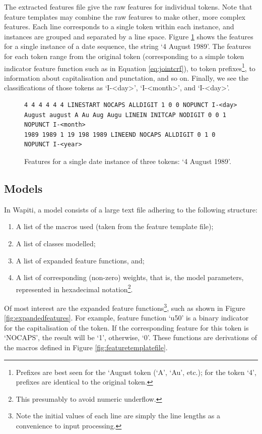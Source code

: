 The extracted features file give the raw features for individual tokens. Note that feature templates may combine the raw features to make other, more complex features. Each line corresponds to a single token within each instance, and instances are grouped and separated by a line space. Figure \ref{fig:extractedfeatures} shows the features for a single instance of a date sequence, the string `4 August 1989'. The features for each token range from the original token (corresponding to a simple token indicator feature function such as in Equation \ref{eq:jointcrf}), to token prefixes\footnote{Prefixes are best seen for the `August token (`A', `Au', etc.); for the token `4', prefixes are identical to the original token.}, to information about capitalisation and punctation, and so on. Finally, we see the classifications of those tokens as `I-<day>', `I-<month>', and `I-<day>'.

\begin{figure}
\centering
\begin{BVerbatim}
4 4 4 4 4 4 LINESTART NOCAPS ALLDIGIT 1 0 0 NOPUNCT I-<day>
August august A Au Aug Augu LINEIN INITCAP NODIGIT 0 0 1 NOPUNCT I-<month>
1989 1989 1 19 198 1989 LINEEND NOCAPS ALLDIGIT 0 1 0 NOPUNCT I-<year>
\end{BVerbatim}
\caption{Features for a single date instance of three tokens: `4 August 1989'.}
\label{fig:extractedfeatures}
\end{figure}

\subsection{Models}

In Wapiti, a model consists of a large text file adhering to the following structure:

\begin{enumerate}
\item A list of the macros used (taken from the feature template file);
\item A list of classes modelled;
\item A list of expanded feature functions, and;
\item A list of corresponding (non-zero) weights, that is, the model parameters, represented in hexadecimal notation\footnote{This presumably to avoid numeric underflow.}.
\end{enumerate}

Of most interest are the expanded feature functions\footnote{Note the initial values of each line are simply the line lengths as a convenience to input processing.}, such as shown in Figure \ref{fig:expandedfeatures}. For example, feature function `u50' is a binary indicator for the capitalisation of the token. If the corresponding feature for this token is `NOCAPS', the result will be `1', otherwise, `0'. These functions are derivations of the macros defined in Figure \ref{fig:featuretemplatefile}.

